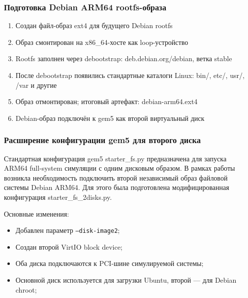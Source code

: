 \documentclass{beamer}
\begin{document}
\begin{frame}
\frametitle{Подготовка Debian ARM64 rootfs-образа}
\begin{enumerate}
    \item Создан файл-образ ext4 для будущего Debian rootfs
    \item Образ смонтирован на x86\_64-хосте как loop-устройство
    \item Rootfs заполнен через debootstrap: deb.debian.org/debian, ветка stable
    \item После debootstrap появились стандартные каталоги Linux: bin/, etc/, usr/, /var и другие
    \item Образ отмонтирован; итоговый артефакт: debian-arm64.ext4
    \item Debian-образ подключён к gem5 как второй виртуальный диск
\end{enumerate}
\end{frame}

\begin{frame}
\frametitle{Расширение конфигурации gem5 для второго диска}
Стандартная конфигурация gem5 starter\_fs.py предназначена для запуска ARM64 full-system симуляции с одним дисковым образом.
В рамках работы возникла необходимость подключить второй независимый образ файловой системы Debian ARM64. Для этого была подготовлена модифицированная конфигурация starter\_fs\_2disks.py.

\medskip
Основные изменения:
\begin{itemize}
    \item Добавлен параметр \texttt{--disk-image2};
    \item Создан второй VirtIO block device;
    \item Оба диска подключаются к PCI-шине симулируемой системы;
    \item Основной диск используется для загрузки Ubuntu, второй --- для Debian chroot;
\end{itemize}
\end{frame}
\end{document}
